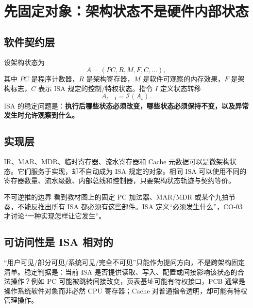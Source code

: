 \documentclass[UTF8,fontset=fandol,11pt,a4paper]{ctexart}
\newcommand{\kw}[1]{\textbf{\color{deep}#1}}
\begin{document}
\begin{center}
\end{center}

\tableofcontents
\newpage

\section{先固定对象：架构状态不是硬件内部状态}

\subsection{软件契约层}
设架构状态为
\[
A=(PC,R,M,F,C,\ldots),
\]
其中 $PC$ 是程序计数器，$R$ 是架构寄存器，$M$ 是软件可观察的内存效果，$F$ 是架构标志，$C$ 表示 ISA 规定的控制/特权状态。指令 $I$ 定义状态转移
\[
A_{t+1}=\mathcal I(A_t).
\]
ISA 的稳定问题是：\kw{执行后哪些状态必须改变，哪些状态必须保持不变，以及异常发生时允许观察到什么。}

\subsection{实现层}
IR、MAR、MDR、临时寄存器、流水寄存器和 Cache 元数据可以是微架构状态。它们服务于实现，却不自动成为 ISA 规定的对象。相同 ISA 可以使用不同的寄存器数量、流水级数、内部总线和控制器，只要架构状态轨迹与契约等价。

\begin{warnbox}{不可逆推的边界}
看到教材图上的固定 PC 加法器、MAR/MDR 或某个九拍节奏，不能反推出所有 ISA 都必须有这些部件。ISA 定义“必须发生什么”，CO-03 才讨论“一种实现怎样让它发生”。
\end{warnbox}

\subsection{可访问性是 ISA 相对的}
“用户可见/部分可见/系统可见/完全不可见”只能作为提问方向，不是跨架构固定清单。稳定判据是：当前 ISA 是否提供读取、写入、配置或间接影响该状态的合法操作？例如 PC 可能被跳转间接改变，页表基址可能有特权接口，PCB 通常是操作系统软件对象而非必然 CPU 寄存器；Cache 对普通指令透明，却可能有特权管理操作。
\end{document}
